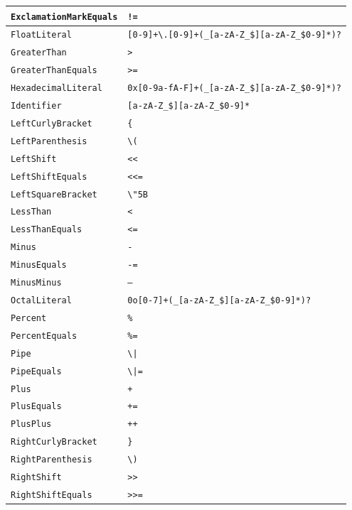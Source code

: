 \begin{xltabular}{\textwidth}{l|X}
	\texttt{ExclamationMarkEquals} & \texttt{!=} \\ \hline
	\texttt{FloatLiteral} & \texttt{[0-9]+\textbackslash.[0-9]+(\_[a-zA-Z\_\$][a-zA-Z\_\$0-9]*)?} \\ \hline
	\texttt{GreaterThan} & \texttt{>} \\ \hline
	\texttt{GreaterThanEquals} & \texttt{>=} \\ \hline
	\texttt{HexadecimalLiteral} & \texttt{0x[0-9a-fA-F]+(\_[a-zA-Z\_\$][a-zA-Z\_\$0-9]*)?} \\ \hline
	\texttt{Identifier} & \texttt{[a-zA-Z\_\$][a-zA-Z\_\$0-9]*} \\ \hline
	\texttt{LeftCurlyBracket} & \texttt{\{} \\ \hline
	\texttt{LeftParenthesis} & \texttt{\textbackslash (} \\ \hline
	\texttt{LeftShift} & \texttt{<<} \\ \hline
	\texttt{LeftShiftEquals} & \texttt{<<=} \\ \hline
	\texttt{LeftSquareBracket} & \texttt{\textbackslash \char"5B} \\ \hline
	\texttt{LessThan} & \texttt{<} \\ \hline
	\texttt{LessThanEquals} & \texttt{<=} \\ \hline
	\texttt{Minus} & \texttt{-} \\ \hline
	\texttt{MinusEquals} & \texttt{-=} \\ \hline
	\texttt{MinusMinus} & \texttt{--} \\ \hline
	\texttt{OctalLiteral} & \texttt{0o[0-7]+(\_[a-zA-Z\_\$][a-zA-Z\_\$0-9]*)?} \\ \hline
	\texttt{Percent} & \texttt{\%} \\ \hline
	\texttt{PercentEquals} & \texttt{\%=} \\ \hline
	\texttt{Pipe} & \texttt{\textbackslash |} \\ \hline
	\texttt{PipeEquals} & \texttt{\textbackslash |=} \\ \hline
	\texttt{Plus} & \texttt{+} \\ \hline
	\texttt{PlusEquals} & \texttt{+=} \\ \hline
	\texttt{PlusPlus} & \texttt{++} \\ \hline
	\texttt{RightCurlyBracket} & \texttt{\}} \\ \hline
	\texttt{RightParenthesis} & \texttt{\textbackslash )} \\ \hline
	\texttt{RightShift} & \texttt{>>} \\ \hline
	\texttt{RightShiftEquals} & \texttt{>>=} \\ \hline

\end{xltabular}
